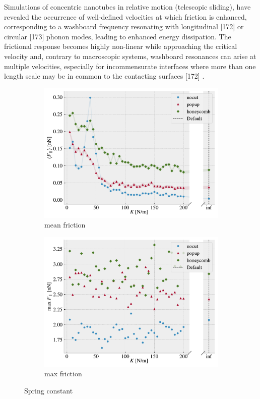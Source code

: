 Simulations of concentric nanotubes in relative motion (telescopic sliding), have revealed the occurrence of well-defined velocities at which friction is enhanced, corresponding to a washboard frequency resonating with longitudinal [172] or circular [173] phonon modes, leading to enhanced energy dissipation. The frictional response becomes highly non-linear while approaching the critical velocity and, contrary to macroscopic systems, washboard resonances can arise at multiple velocities, especially for incommensurate interfaces where more than one length scale may be in common to the contacting surfaces [172] \cite{Manini_2016}.


\begin{figure}[H]
  \centering
  \begin{subfigure}[b]{0.49\textwidth}
      \centering
      \includegraphics[width=\textwidth]{figures/baseline/variables_spring_mean_fixmove.pdf}
      \caption{mean friction}
      \label{fig:var_K_mean}
  \end{subfigure}
  \hfill
  \begin{subfigure}[b]{0.49\textwidth}
      \centering
      \includegraphics[width=\textwidth]{figures/baseline/variables_spring_max_fixmove.pdf}
      \caption{max friction}
      \label{fig:var_K_max}
  \end{subfigure}
  \hfill
     \caption{Spring constant}
     \label{fig:var_K}
\end{figure}
